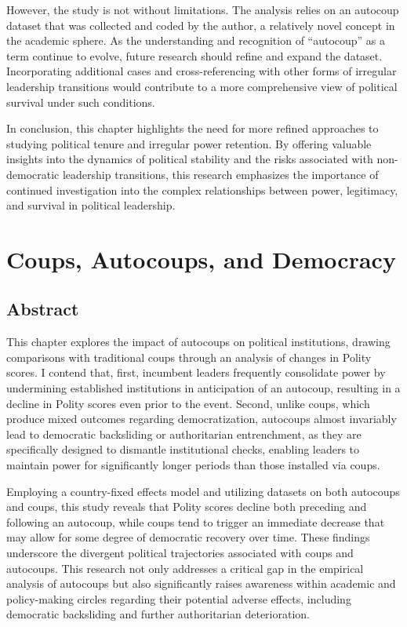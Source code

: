 \documentclass[
  12pt,
]{report}
\begin{document}
However, the study is not without limitations. The analysis relies on an
autocoup dataset that was collected and coded by the author, a
relatively novel concept in the academic sphere. As the understanding
and recognition of ``autocoup'' as a term continue to evolve, future
research should refine and expand the dataset. Incorporating additional
cases and cross-referencing with other forms of irregular leadership
transitions would contribute to a more comprehensive view of political
survival under such conditions.

In conclusion, this chapter highlights the need for more refined
approaches to studying political tenure and irregular power retention.
By offering valuable insights into the dynamics of political stability
and the risks associated with non-democratic leadership transitions,
this research emphasizes the importance of continued investigation into
the complex relationships between power, legitimacy, and survival in
political leadership.

\chapter{Coups, Autocoups, and
Democracy}\label{coups-autocoups-and-democracy}

\section*{Abstract}\label{abstract-4}

This chapter explores the impact of autocoups on political institutions,
drawing comparisons with traditional coups through an analysis of
changes in Polity scores. I contend that, first, incumbent leaders
frequently consolidate power by undermining established institutions in
anticipation of an autocoup, resulting in a decline in Polity scores
even prior to the event. Second, unlike coups, which produce mixed
outcomes regarding democratization, autocoups almost invariably lead to
democratic backsliding or authoritarian entrenchment, as they are
specifically designed to dismantle institutional checks, enabling
leaders to maintain power for significantly longer periods than those
installed via coups.

Employing a country-fixed effects model and utilizing datasets on both
autocoups and coups, this study reveals that Polity scores decline both
preceding and following an autocoup, while coups tend to trigger an
immediate decrease that may allow for some degree of democratic recovery
over time. These findings underscore the divergent political
trajectories associated with coups and autocoups. This research not only
addresses a critical gap in the empirical analysis of autocoups but also
significantly raises awareness within academic and policy-making circles
regarding their potential adverse effects, including democratic
backsliding and further authoritarian deterioration.
\end{document}
